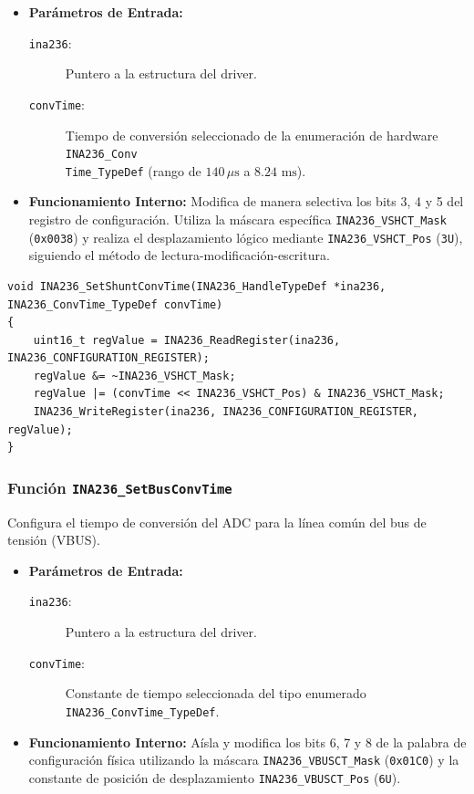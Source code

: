 \documentclass[
10pt, %
a4paper, %
oneside, %
headinclude,footinclude, %
BCOR5mm, %
]{scrartcl}
\begin{document}
\begin{itemize}
	\item \textbf{Parámetros de Entrada:}
		\begin{description}
			\item[\texttt{ina236}:] Puntero a la estructura del driver.
			\item[\texttt{convTime}:] Tiempo de conversión seleccionado de la enumeración de hardware \texttt{INA236\_Conv\\Time\_TypeDef} (rango de $140\,\mu\text{s}$ a $8.24\text{ ms}$).
		\end{description}
	\item \textbf{Funcionamiento Interno:}
		Modifica de manera selectiva los bits 3, 4 y 5 del registro de configuración. Utiliza la máscara específica \texttt{INA236\_VSHCT\_Mask} (\texttt{0x0038}) y realiza el desplazamiento lógico mediante \texttt{INA236\_VSHCT\_Pos} (\texttt{3U}), siguiendo el método de lectura-modificación-escritura.
\end{itemize}

\begin{lstlisting}[style=CMakeStyle]
void INA236_SetShuntConvTime(INA236_HandleTypeDef *ina236, INA236_ConvTime_TypeDef convTime)
{
    uint16_t regValue = INA236_ReadRegister(ina236, INA236_CONFIGURATION_REGISTER);
    regValue &= ~INA236_VSHCT_Mask;
    regValue |= (convTime << INA236_VSHCT_Pos) & INA236_VSHCT_Mask;
    INA236_WriteRegister(ina236, INA236_CONFIGURATION_REGISTER, regValue);
}
\end{lstlisting}

\subsubsection{Función \texttt{INA236\_SetBusConvTime}}
Configura el tiempo de conversión del ADC para la línea común del bus de tensión (VBUS).

\begin{itemize}
	\item \textbf{Parámetros de Entrada:}
		\begin{description}
			\item[\texttt{ina236}:] Puntero a la estructura del driver.
			\item[\texttt{convTime}:] Constante de tiempo seleccionada del tipo enumerado \texttt{INA236\_ConvTime\_TypeDef}.
		\end{description}
	\item \textbf{Funcionamiento Interno:}
		Aísla y modifica los bits 6, 7 y 8 de la palabra de configuración física utilizando la máscara \texttt{INA236\_VBUSCT\_Mask} (\texttt{0x01C0}) y la constante de posición de desplazamiento \texttt{INA236\_VBUSCT\_Pos} (\texttt{6U}).
\end{itemize}
\end{document}
